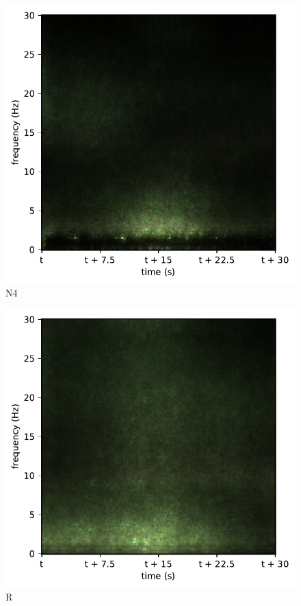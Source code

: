 \begin{subfigure}{.16\textwidth}
  \centering
  \includegraphics[width=1\linewidth]{./../Article/pics/class_rnn_4}
  \caption{N4}
  \label{fig_1_35}
\end{subfigure}%
\begin{subfigure}{.16\textwidth}
  \centering
  \includegraphics[width=1\linewidth]{./../Article/pics/class_rnn_5}
  \caption{R}
  \label{fig_1_36}
\end{subfigure}
